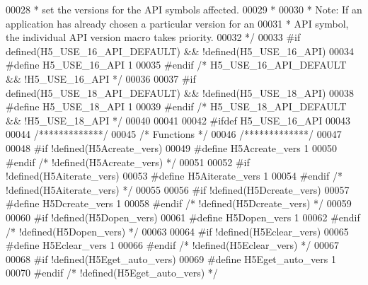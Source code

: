 \begin{DoxyCode}
00028 \textcolor{comment}{ *      set the versions for the API symbols affected.}
00029 \textcolor{comment}{ *}
00030 \textcolor{comment}{ * Note: If an application has already chosen a particular version for an}
00031 \textcolor{comment}{ *      API symbol, the individual API version macro takes priority.}
00032 \textcolor{comment}{ */}
00033 \textcolor{preprocessor}{#if defined(H5\_USE\_16\_API\_DEFAULT) && !defined(H5\_USE\_16\_API)}
00034 \textcolor{preprocessor}{  #define H5\_USE\_16\_API 1}
00035 \textcolor{preprocessor}{#endif }\textcolor{comment}{/* H5\_USE\_16\_API\_DEFAULT && !H5\_USE\_16\_API */}\textcolor{preprocessor}{}
00036 
00037 \textcolor{preprocessor}{#if defined(H5\_USE\_18\_API\_DEFAULT) && !defined(H5\_USE\_18\_API)}
00038 \textcolor{preprocessor}{  #define H5\_USE\_18\_API 1}
00039 \textcolor{preprocessor}{#endif }\textcolor{comment}{/* H5\_USE\_18\_API\_DEFAULT && !H5\_USE\_18\_API */}\textcolor{preprocessor}{}
00040 
00041 
00042 \textcolor{preprocessor}{#ifdef H5\_USE\_16\_API}
00043 
00044 \textcolor{comment}{/*************/}
00045 \textcolor{comment}{/* Functions */}
00046 \textcolor{comment}{/*************/}
00047 
00048 \textcolor{preprocessor}{#if !defined(H5Acreate\_vers)}
00049 \textcolor{preprocessor}{  #define H5Acreate\_vers 1}
00050 \textcolor{preprocessor}{#endif }\textcolor{comment}{/* !defined(H5Acreate\_vers) */}\textcolor{preprocessor}{}
00051 
00052 \textcolor{preprocessor}{#if !defined(H5Aiterate\_vers)}
00053 \textcolor{preprocessor}{  #define H5Aiterate\_vers 1}
00054 \textcolor{preprocessor}{#endif }\textcolor{comment}{/* !defined(H5Aiterate\_vers) */}\textcolor{preprocessor}{}
00055 
00056 \textcolor{preprocessor}{#if !defined(H5Dcreate\_vers)}
00057 \textcolor{preprocessor}{  #define H5Dcreate\_vers 1}
00058 \textcolor{preprocessor}{#endif }\textcolor{comment}{/* !defined(H5Dcreate\_vers) */}\textcolor{preprocessor}{}
00059 
00060 \textcolor{preprocessor}{#if !defined(H5Dopen\_vers)}
00061 \textcolor{preprocessor}{  #define H5Dopen\_vers 1}
00062 \textcolor{preprocessor}{#endif }\textcolor{comment}{/* !defined(H5Dopen\_vers) */}\textcolor{preprocessor}{}
00063 
00064 \textcolor{preprocessor}{#if !defined(H5Eclear\_vers)}
00065 \textcolor{preprocessor}{  #define H5Eclear\_vers 1}
00066 \textcolor{preprocessor}{#endif }\textcolor{comment}{/* !defined(H5Eclear\_vers) */}\textcolor{preprocessor}{}
00067 
00068 \textcolor{preprocessor}{#if !defined(H5Eget\_auto\_vers)}
00069 \textcolor{preprocessor}{  #define H5Eget\_auto\_vers 1}
00070 \textcolor{preprocessor}{#endif }\textcolor{comment}{/* !defined(H5Eget\_auto\_vers) */}\textcolor{preprocessor}{}

\end{DoxyCode}
